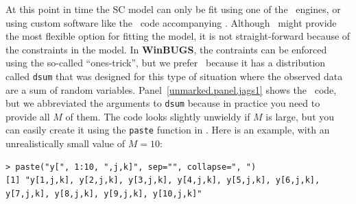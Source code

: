 At this point in time the SC model can only be fit using one of the
\bugs~engines, or using custom software like the \R~code accompanying
\citet{chandler_royle:2012}. Although \bugs~might provide the most
flexible option for fitting the model, it is not
straight-forward because of the
constraints in the model. In \textbf{WinBUGS}, the contraints can be
enforced using the so-called ``ones-trick'', but we prefer
\jags~because it has a distribution
called \verb+dsum+ that was designed for this type
of situation where the observed data are a sum of random
variables. %
Panel~\ref{unmarked.panel.jags1} shows the \jags~code, but
we abbreviated the
arguments to \verb+dsum+ because in practice you need to provide all $M$ of
them. %
The code looks slightly unwieldy if $M$ is large, but you can easily create
it using the \verb+paste+ function in \R. Here is an example, with an
unrealistically small value of $M=10$:
\begin{small}
\begin{verbatim}
> paste("y[", 1:10, ",j,k]", sep="", collapse=", ")
[1] "y[1,j,k], y[2,j,k], y[3,j,k], y[4,j,k], y[5,j,k], y[6,j,k],
y[7,j,k], y[8,j,k], y[9,j,k], y[10,j,k]"
\end{verbatim}
\end{small}

